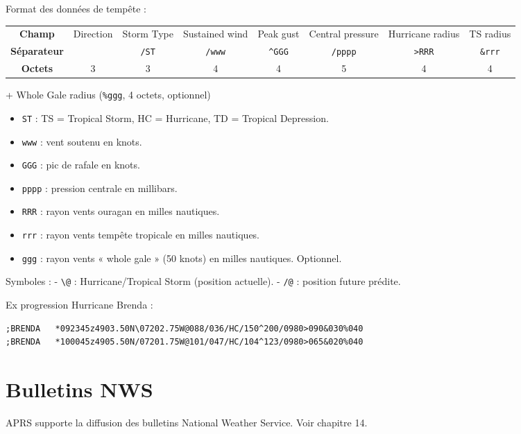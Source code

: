 Format des données de tempête :

\begin{center}
\begin{tabular}{|c|c|c|c|c|c|c|c|}
\hline
\textbf{Champ} & Direction & Storm Type & Sustained wind & Peak gust & Central pressure & Hurricane radius & TS radius \\
\textbf{Séparateur} &  & \texttt{/ST} & \texttt{/www} & \texttt{\^{}GGG} & \texttt{/pppp} & \texttt{>RRR} & \texttt{\&rrr} \\
\textbf{Octets} & 3 & 3 & 4 & 4 & 5 & 4 & 4 \\
\hline
\end{tabular}
\end{center}
\noindent + Whole Gale radius (\texttt{\%ggg}, 4 octets, optionnel)

\begin{itemize}
\tightlist
\item
  \texttt{ST} : TS = Tropical Storm, HC = Hurricane, TD = Tropical
  Depression.
\item
  \texttt{www} : vent soutenu en knots.
\item
  \texttt{GGG} : pic de rafale en knots.
\item
  \texttt{pppp} : pression centrale en millibars.
\item
  \texttt{RRR} : rayon vents ouragan en milles nautiques.
\item
  \texttt{rrr} : rayon vents tempête tropicale en milles nautiques.
\item
  \texttt{ggg} : rayon vents « whole gale » (50 knots) en milles
  nautiques. Optionnel.
\end{itemize}

Symboles : - \texttt{\textbackslash{}@} : Hurricane/Tropical Storm
(position actuelle). - \texttt{/@} : position future prédite.

Ex progression Hurricane Brenda :

\begin{verbatim}
;BRENDA   *092345z4903.50N\07202.75W@088/036/HC/150^200/0980>090&030%040
;BRENDA   *100045z4905.50N/07201.75W@101/047/HC/104^123/0980>065&020%040
\end{verbatim}

\section{Bulletins NWS}\label{bulletins-nws}

APRS supporte la diffusion des bulletins National Weather Service. Voir
chapitre 14.

